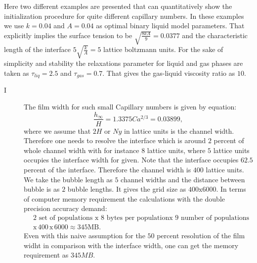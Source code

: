 \documentclass{article}
\begin{document}
Here two different examples are presented that can quantitatively show the
initialization procedure for quite different capillary numbers. In these
examples we use $k=0.04$ and $A=0.04$ as optimal binary liquid model parameters.
That explicitly implies the surface tension to be $\sqrt{\frac{8 k
A}{9}}=0.0377$ and the characteristic length of the interface
$5\sqrt{\frac{k}{A}}=5$ lattice boltzmann units. For the sake of simplicity and
stability the relaxations parameter for liquid and gas phases are taken as
$\tau_{liq}=2.5$ and $\tau_{gas}=0.7$. That gives the gas-liquid viscosity ratio
as $10$.  
\begin{description}
 \item[I ]
  The film width for such small Capillary numbers \cite{bretherton} is
given by equation:
  \begin{equation}
  \frac{h_{\infty}}{H}=1.3375 Ca^{2/3}=0.03899,
  \end{equation}
  where we assume that $2 H$ or $Ny$ in lattice units is the channel width.
Therefore one needs to resolve the interface which is around $2$ percent of
  whole channel width with for instance $8$ lattice units, where $5$ lattice
units occupies the interface width for given. Note that the interface occupies
$62.5$ percent of the interface.  Therefore the channel
  width is $400$ lattice units. We take the bubble length as $5$ channel widths
  and the distance between bubble is as $2$ bubble lengths. It gives the
grid size as $400\mathrm{x}6000$. In terms of computer memory
requirement the calculations with the double precision accuracy demand:
\begin{equation}
\begin{aligned}
&2\text{ set of populations }\mathrm{x}\,\, 8\,\, \text{bytes per population
}\mathrm{x}\,\, 9 \text{ number of
populations}\\
&\mathrm{x}\,400\,\mathrm{x}\,6000\approx 345 \mathrm{MB}. 
\end{aligned}
\end{equation}
Even with this naive assumption for the $50$ percent resolution of the film
widht in comparison with the interface width, one can get the memory
requirement as $345 MB$. 


\end{description}
\end{document}
